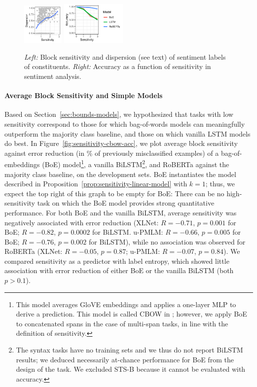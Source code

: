 \documentclass[11pt,a4paper]{article}
\begin{document}
\begin{figure}
    \includegraphics[width=0.18\textwidth]{code/perExample/outputs/subspans_s1ensitivity_rev.pdf}
    \includegraphics[width=0.28\textwidth]{code/perExample/outputs/s1ensitivity_accuracy_roberta-cbow-lstm.pdf}
	\caption{\textit{Left:} Block sensitivity and dispersion (see text) of sentiment labels of constituents. \textit{Right:} Accuracy as a function of sensitivity in sentiment analysis.}\label{fig:sst-sens}
\end{figure}




\paragraph{Average Block Sensitivity and Simple Models}

Based on Section~\ref{sec:bounds-models}, we hypothesized that tasks with low sensitivity correspond to those for which bag-of-words models can meaningfully outperform the majority class baseline, and those on which vanilla LSTM models do best.
In Figure~\ref{fig:sensitivity-cbow-acc}, we plot average block sensitivity against error reduction (in \% of previously misclassified examples) of a bag-of-embeddings (BoE) model\footnote{This model averages GloVE \citep{pennington2014glove} embeddings and applies a one-layer MLP to derive a prediction. This model is called CBOW in \citet{wang2019glue}; however, we apply BoE to concatenated spans in the case of multi-span tasks, in line with the definition of sensitivity.}, a vanilla BiLSTM\footnote{The syntax tasks have no training sets and we thus do not report BiLSTM results; we deduced necessarily at-chance performance for BoE from the design of the task. We excluded STS-B because it cannot be evaluated with accuracy.}, and RoBERTa against the majority class baseline, on the development sets.
BoE instantiates the model described in Proposition~\ref{prop:sensitivity-linear-model} with $k=1$; thus, we expect the top right of this graph to be empty for BoE: There can be no high-sensitivity task on which the BoE model provides strong quantitative performance.
For both BoE and the vanilla BiLSTM, average sensitivity was negatively associated with error reduction (XLNet: $R = -0.71$, $p=0.001$ for BoE; $R=-0.82$, $p=0.0002$ for BiLSTM. u-PMLM: $R=-0.66$, $p=0.005$ for BoE; $R=-0.76$, $p=0.002$ for BiLSTM), while no association was observed for RoBERTa (XLNet: $R=-0.05$, $p=0.87$; u-PMLM: $R=-0.07$, $p=0.84$).
We compared sensitivity as a predictor with label entropy, which showed little association with error reduction of either BoE or the vanilla BiLSTM (both $p > 0.1$).
\end{document}
